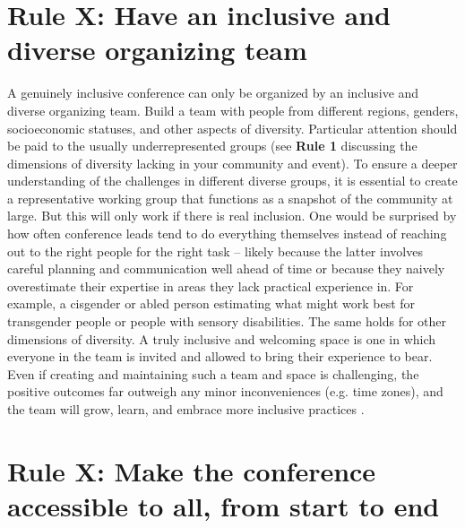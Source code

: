 \documentclass[10pt,letterpaper]{article}
\begin{document}
\section{Rule X: Have an inclusive and diverse organizing team}
A genuinely inclusive conference can only be organized by an inclusive and diverse organizing team. Build a team with people from different regions, genders, socioeconomic statuses, and other aspects of diversity. Particular attention should be paid to the usually underrepresented groups (see \textbf{Rule 1} discussing the dimensions of diversity lacking in your community and event). To ensure a deeper understanding of the challenges in different diverse groups, it is essential to create a representative working group that functions as a snapshot of the community at large. But this will only work if there is real inclusion. One would be surprised by how often conference leads tend to do everything themselves instead of reaching out to the right people for the right task -- likely because the latter involves careful planning and communication well ahead of time or because they naively overestimate their expertise in areas they lack practical experience in. For example, a cisgender or abled person estimating what might work best for transgender people or people with sensory disabilities. The same holds for other dimensions of diversity. A truly inclusive and welcoming space is one in which everyone in the team is invited and allowed to bring their experience to bear. Even if creating and maintaining such a team and space is challenging, the positive outcomes far outweigh any minor inconveniences (e.g. time zones), and the team will grow, learn, and embrace more inclusive practices \cite{hong_groups_2004}. 



\section{Rule X: Make the conference accessible to all, from start to end}
\end{document}
